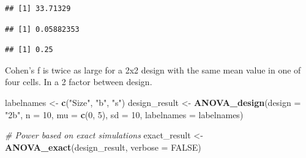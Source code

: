 \documentclass[]{book}
\newenvironment{Shaded}{\begin{snugshade}}{\end{snugshade}}
\newcommand{\CommentTok}[1]{\textcolor[rgb]{0.56,0.35,0.01}{\textit{#1}}}
\newcommand{\DataTypeTok}[1]{\textcolor[rgb]{0.13,0.29,0.53}{#1}}
\newcommand{\DecValTok}[1]{\textcolor[rgb]{0.00,0.00,0.81}{#1}}
\newcommand{\KeywordTok}[1]{\textcolor[rgb]{0.13,0.29,0.53}{\textbf{#1}}}
\newcommand{\NormalTok}[1]{#1}
\newcommand{\OperatorTok}[1]{\textcolor[rgb]{0.81,0.36,0.00}{\textbf{#1}}}
\newcommand{\OtherTok}[1]{\textcolor[rgb]{0.56,0.35,0.01}{#1}}
\newcommand{\StringTok}[1]{\textcolor[rgb]{0.31,0.60,0.02}{#1}}
\begin{document}
\begin{Shaded}
\end{Shaded}

\begin{verbatim}
## [1] 33.71329
\end{verbatim}

\begin{Shaded}
\end{Shaded}

\begin{verbatim}
## [1] 0.05882353
\end{verbatim}

\begin{Shaded}
\end{Shaded}

\begin{verbatim}
## [1] 0.25
\end{verbatim}

Cohen's f is twice as large for a 2x2 design with the same mean value in one of four cells. In a 2 factor between design.

\begin{Shaded}
\begin{Highlighting}[]
\NormalTok{labelnames <-}\StringTok{ }\KeywordTok{c}\NormalTok{(}\StringTok{"Size"}\NormalTok{, }\StringTok{"b"}\NormalTok{, }\StringTok{"s"}\NormalTok{)}
\NormalTok{design_result <-}\StringTok{ }\KeywordTok{ANOVA_design}\NormalTok{(}\DataTypeTok{design =} \StringTok{"2b"}\NormalTok{, }
                              \DataTypeTok{n =} \DecValTok{10}\NormalTok{,  }
                              \DataTypeTok{mu =} \KeywordTok{c}\NormalTok{(}\DecValTok{0}\NormalTok{, }\DecValTok{5}\NormalTok{), }
                              \DataTypeTok{sd =} \DecValTok{10}\NormalTok{, }
                              \DataTypeTok{labelnames =}\NormalTok{ labelnames) }

\CommentTok{# Power based on exact simulations}
\NormalTok{exact_result <-}\StringTok{ }\KeywordTok{ANOVA_exact}\NormalTok{(design_result,}
                            \DataTypeTok{verbose =} \OtherTok{FALSE}\NormalTok{)}
\end{Highlighting}
\end{Shaded}
\end{document}
